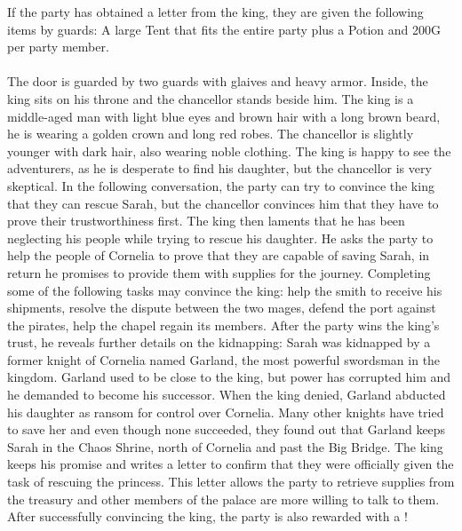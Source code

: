 If the party has obtained a letter from the king, they are given the following items by guards: 
A large Tent that fits the entire party plus a Potion and 200G per party member.
%
\ofpar
%
\\\\
%
 The door is guarded by two guards with glaives and heavy armor.
Inside, the king sits on his throne and the chancellor stands beside him.
The king is a middle-aged man with light blue eyes and brown hair with a long brown beard, he is wearing a golden crown and long red robes.
The chancellor is slightly younger with dark hair, also wearing noble clothing.
The king is happy to see the adventurers, as he is desperate to find his daughter, but the chancellor is very skeptical.
In the following conversation, the party can try to convince the king that they can rescue Sarah, but the chancellor convinces him that they have to prove their trustworthiness first.
The king then laments that he has been neglecting his people while trying to rescue his daughter.
He asks the party to help the people of Cornelia to prove that they are capable of saving Sarah, in return he promises to provide them with supplies for the journey.
Completing some of the following tasks may convince the king: help the smith to receive his shipments, resolve the dispute between the two mages, defend the port against the pirates, help the chapel regain its members.
After the party wins the king's trust, he reveals further details on the kidnapping:
Sarah was kidnapped by a former knight of Cornelia named Garland, the most powerful swordsman in the kingdom.
Garland used to be close to the king, but power has corrupted him and he demanded to become his successor. 
When the king denied, Garland abducted his daughter as ransom for control over Cornelia.
Many other knights have tried to save her and even though none succeeded, they found out that Garland keeps Sarah in the Chaos Shrine, north of Cornelia and past the Big Bridge.
The king keeps his promise and writes a letter to confirm that they were officially given the task of rescuing the princess.
This letter allows the party to retrieve supplies from the treasury and other members of the palace are more willing to talk to them.
After successfully convincing the king, the party is also rewarded with a !
%
\ofpar
%
